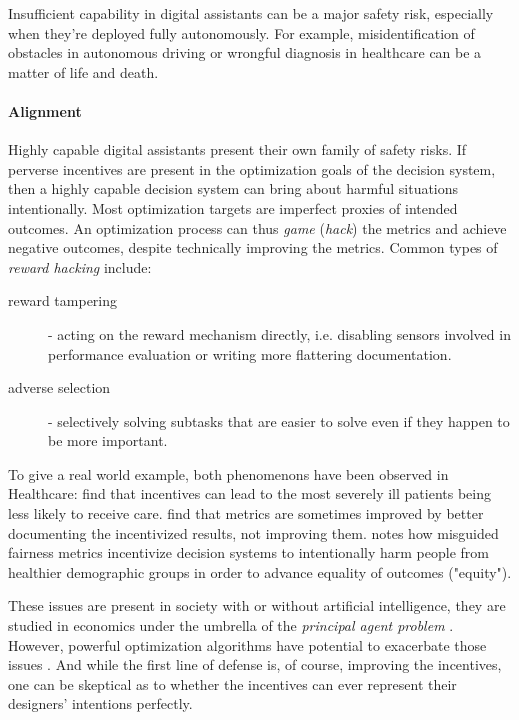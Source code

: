 Insufficient capability in digital assistants can be a major safety risk, especially when they're deployed fully autonomously. For example, misidentification of obstacles in autonomous driving \cite{sheebajoiceObstacleDetectionSafe2023} or wrongful diagnosis in healthcare \cite{wintersDiagnosticErrorsIntensive2012} can be a matter of life and death.

\paragraph{Alignment}

Highly capable digital assistants present their own family of safety risks. 
If perverse incentives are present in the optimization goals of the decision system, then a highly capable decision system can bring about harmful situations intentionally.
Most optimization targets are imperfect proxies of intended outcomes. 
An optimization process can thus \emph{game} (\emph{hack}) the metrics and achieve negative outcomes, despite technically improving the metrics.
Common types of \emph{reward hacking} \cite{skalseDefiningCharacterizingReward2022} include:
\begin{description}
    \item[reward tampering] \cite{everittRewardTamperingProblems2021, skalseInvariancePolicyOptimisation2023} - acting on the reward mechanism directly, i.e. disabling sensors involved in performance evaluation or writing more flattering documentation.
    \item[adverse selection] - selectively solving subtasks that are easier to solve even if they happen to be more important.
\end{description}

To give a real world example, both phenomenons have been observed in Healthcare: \cite{shenSelectionIncentivesPerformance2003} find that incentives can lead to the most severely ill patients being less likely to receive care. \cite{fairbrotherImpactFinancialIncentives2001, ImpactPhysicianBonuses, roskiImpactFinancialIncentives2003} find that metrics are sometimes improved by better documenting the incentivized results, not improving them.
\cite{longFairnessMachineLearning2021} notes how misguided fairness metrics incentivize decision systems to intentionally harm people from healthier demographic groups in order to advance equality of outcomes ("equity").

These issues are present in society \cite{nestianPerverseIncentiveGeneral2017} with or without artificial intelligence, they are studied in economics under the umbrella of the \emph{principal agent problem} \cite{pandaAgencyTheoryReview2017}. 
However, powerful optimization algorithms have potential to exacerbate those issues \cite{hadfield-menellIncompleteContractingAI2019}. 
And while the first line of defense is, of course, improving the incentives, one can be skeptical as to whether the incentives can ever represent their designers' intentions perfectly.

